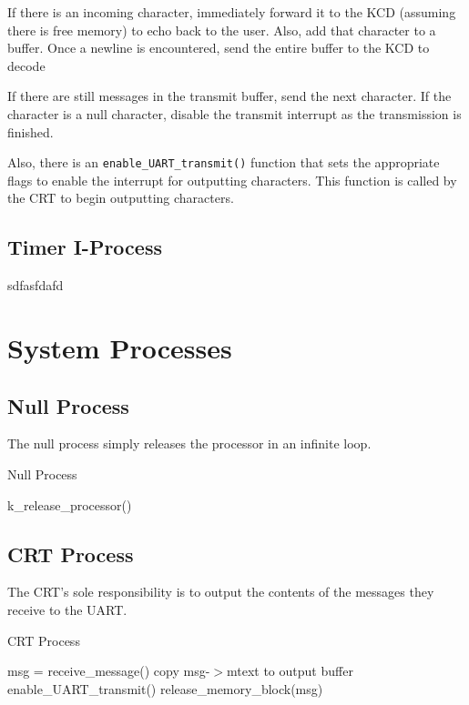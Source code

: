 \documentclass[12pt]{report}
\begin{document}
If there is an incoming character, immediately forward it to the KCD (assuming there is free memory) to echo back to the user. Also, add that character to a buffer. Once a newline is encountered, send the entire buffer to the KCD to decode

If there are still messages in the transmit buffer, send the next character. If the character is a null character, disable the transmit interrupt as the transmission is finished.


Also, there is an \texttt{enable_UART_transmit()} function that sets the appropriate flags to enable the interrupt for outputting characters. This function is called by the CRT to begin outputting characters.


\subsection{Timer I-Process}

sdfasfdafd


\section{System Processes}

\subsection{Null Process}

The null process simply releases the processor in an infinite loop.

\begin{algorithm}[H]
	\caption{Null Process}
	\begin{algorithmic}[1]
				\State k_release_processor()
			\EndWhile
		\EndFunction		
	\end{algorithmic}
\end{algorithm}

\subsection{CRT Process}

The CRT's sole responsibility is to output the contents of the messages they receive to the UART.

\begin{algorithm}[H]
	\caption{CRT Process}
	\begin{algorithmic}[1]
	      \State msg = receive\_message()
	      \State copy msg-$>$mtext to output buffer
	      \State enable\_UART\_transmit()
	      \State release\_memory\_block(msg)
	    \EndWhile
	  \EndFunction
	\end{algorithmic}
\end{algorithm}
\end{document}
